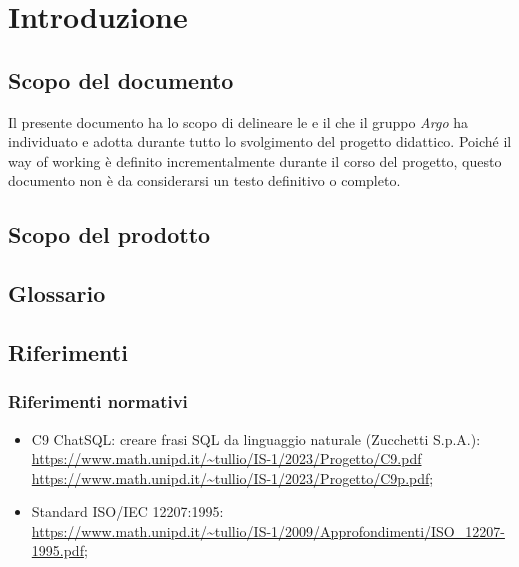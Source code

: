 \section{Introduzione}

\subsection{Scopo del documento}
Il presente documento ha lo scopo di delineare le  e il  che il gruppo \textit{Argo} ha individuato e adotta durante tutto lo svolgimento del progetto didattico. Poiché il way of working è definito incrementalmente durante il corso del progetto, questo documento non è da considerarsi un testo definitivo o completo.

\subsection{Scopo del prodotto}
\ScopoDelProdotto


\subsection{Glossario}
\GlossarioIntroduzione


\subsection{Riferimenti}

\subsubsection{Riferimenti normativi}
\begin{itemize}
  \item C9 ChatSQL: creare frasi SQL da linguaggio naturale (Zucchetti S.p.A.):\\ \url{https://www.math.unipd.it/~tullio/IS-1/2023/Progetto/C9.pdf}\\ \url{https://www.math.unipd.it/~tullio/IS-1/2023/Progetto/C9p.pdf};
  \item Standard ISO/IEC 12207:1995:\\ \url{https://www.math.unipd.it/~tullio/IS-1/2009/Approfondimenti/ISO_12207-1995.pdf};
\end{itemize}

